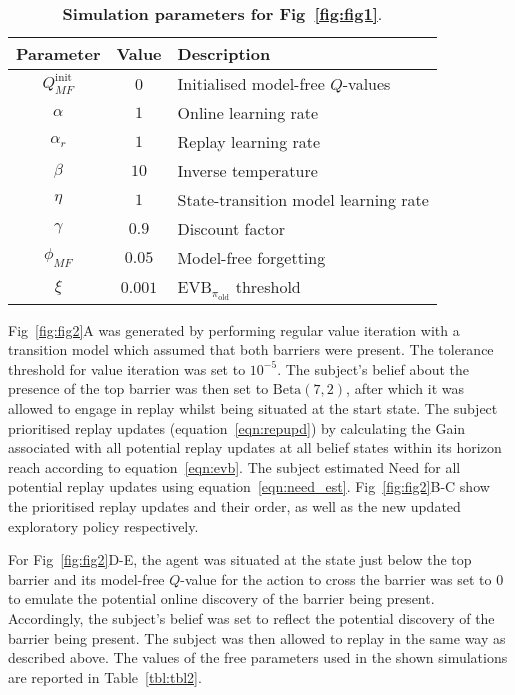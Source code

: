 \begin{table}[h!]
    \centering
    \begin{tabular}{c|c|l}
         Parameter & Value & Description \\ \hline
         $Q_{MF}^{\text{init}}$ & 0 & Initialised model-free $Q$-values \\
         $\alpha$ & $1$ & Online learning rate \\
         $\alpha_r$ & $1$ & Replay learning rate \\
         $\beta$ & $10$ & Inverse temperature \\
         $\eta$ & $1$ & State-transition model learning rate \\
         $\gamma$ & $0.9$ & Discount factor \\
         $\phi_{MF}$ & $0.05$ & Model-free forgetting \\
         $\xi$ & $0.001$ & $\text{EVB}_{\pi_{\text{old}}}$ threshold \\
    \end{tabular}
    \caption{\textbf{Simulation parameters for Fig~\ref{fig:fig1}}.}
    \label{tbl:tbl1}
\end{table}

Fig~\ref{fig:fig2}A was generated by performing regular value iteration with a transition model which assumed that both barriers were present. The tolerance threshold for value iteration was set to $10^{-5}$. The subject's belief about the presence of the top barrier was then set to $\text{Beta}(7, 2)$, after which it was allowed to engage in replay whilst being situated at the start state. The subject prioritised replay updates (equation~\ref{eqn:repupd}) by calculating the Gain associated with all potential replay updates at all belief states within its horizon reach according to equation~\ref{eqn:evb}. The subject estimated Need for all potential replay updates using equation~\ref{eqn:need_est}. Fig~\ref{fig:fig2}B-C show the prioritised replay updates and their order, as well as the new updated exploratory policy respectively.

For Fig~\ref{fig:fig2}D-E, the agent was situated at the state just below the top barrier and its model-free $Q$-value for the action to cross the barrier was set to $0$ to emulate the potential online discovery of the barrier being present. Accordingly, the subject's belief was set to reflect the potential discovery of the barrier being present. The subject was then allowed to replay in the same way as described above. The values of the free parameters used in the shown simulations are reported in Table~\ref{tbl:tbl2}.

